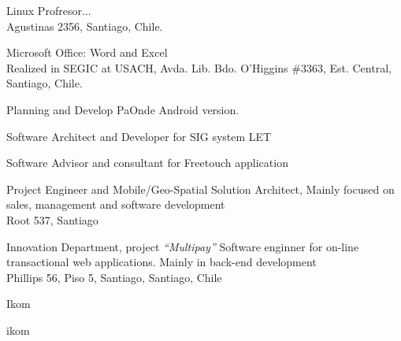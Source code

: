 \documentclass[11pt,letterpaper,roman]{moderncv}
\begin{document}
	 {\se} {\ipgamma} {\stgo} {}
	{Linux Profresor... \\ Agustinas 2356, Santiago, Chile.}
	
	
	 {\se} {\otecnewline} {\stgo} {}
	{Microsoft Office: Word and Excel \\ Realized in SEGIC at USACH, Avda. Lib. Bdo. O'Higgins \#3363, Est.
    Central, Santiago, Chile.}

	 {\se} {\paonde} {\stgo} {}
	{Planning and Develop PaOnde Android version.}

	 {\se} {\jobbitgames} {\stgo} {}
	{Software Architect and Developer for SIG system LET}

	 {\se} {\mataveri} {\stgo} {}
	{Software Advisor and consultant for Freetouch application}

	 {\cf} {\ingennia} {\stgo} {}
	{Project Engineer and Mobile/Geo-Spatial Solution Architect, 
	Mainly focused on sales, management and software development \\
	\small{Root 537, Santiago}}
	
	 {\se} {\multicaja} {\stgo} {}
	{Innovation Department, project \textit{``Multipay''} Software enginner
	for on-line transactional web applications. Mainly in back-end development \\
	\scriptsize {Phillips 56, Piso 5, Santiago, Santiago, Chile}}

	 {\se} {\ikom} {\stgo} {} 
	{Ikom}
	

	 {\intership} {\ikom} {\stgo} {}
	{ikom}
	
\end{document}
